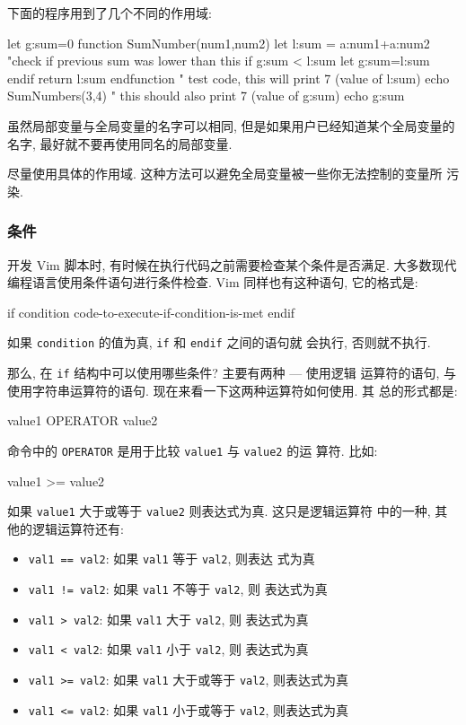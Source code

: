 下面的程序用到了几个不同的作用域:
\begin{vimcode}
let g:sum=0
function SumNumber(num1,num2)
    let l:sum = a:num1+a:num2
    "check if previous sum was lower than this
    if g:sum < l:sum
        let g:sum=l:sum
    endif
    return l:sum
endfunction
" test code, this will print 7 (value of l:sum)
echo SumNumbers(3,4)
" this should also print 7 (value of g:sum)
echo g:sum
\end{vimcode}

虽然局部变量与全局变量的名字可以相同, 但是如果用户已经知道某个全局变量的名字,
最好就不要再使用同名的局部变量.

\begin{warning}
    尽量使用具体的作用域. 这种方法可以避免全局变量被一些你无法控制的变量所
    污染.
\end{warning}

\subsubsection{条件}
\label{subsubsec:conditions}

开发 Vim 脚本时, 有时候在执行代码之前需要检查某个条件是否满足. 大多数现代
编程语言使用条件语句进行条件检查. Vim 同样也有这种语句, 它的格式是:
\begin{vimcode}
if condition
    code-to-execute-if-condition-is-met
endif
\end{vimcode}
如果 \texttt{condition} 的值为真, \texttt{if} 和 \texttt{endif} 之间的语句就
会执行, 否则就不执行.

那么, 在 \texttt{if} 结构中可以使用哪些条件? 主要有两种 --- 使用逻辑
运算符的语句, 与使用字符串运算符的语句. 现在来看一下这两种运算符如何使用. 其
总的形式都是:
\begin{vimcode}
value1 OPERATOR value2
\end{vimcode}
命令中的 \texttt{OPERATOR} 是用于比较 \texttt{value1} 与 \texttt{value2} 的运
算符. 比如:
\begin{vimcode}
value1 >= value2
\end{vimcode}
如果 \texttt{value1} 大于或等于 \texttt{value2} 则表达式为真. 这只是逻辑运算符
中的一种, 其他的逻辑运算符还有:
\begin{itemize}
    \item \texttt{val1 == val2}: 如果 \texttt{val1} 等于 \texttt{val2}, 则表达
        式为真
    \item \texttt{val1 != val2}: 如果 \texttt{val1} 不等于 \texttt{val2}, 则
        表达式为真
    \item \texttt{val1 > val2}: 如果 \texttt{val1} 大于 \texttt{val2}, 则
        表达式为真
    \item \texttt{val1 < val2}: 如果 \texttt{val1} 小于 \texttt{val2}, 则
        表达式为真
    \item \texttt{val1 >= val2}: 如果 \texttt{val1} 大于或等于 \texttt{val2},
        则表达式为真
    \item \texttt{val1 <= val2}: 如果 \texttt{val1} 小于或等于 \texttt{val2},
        则表达式为真
\end{itemize}

